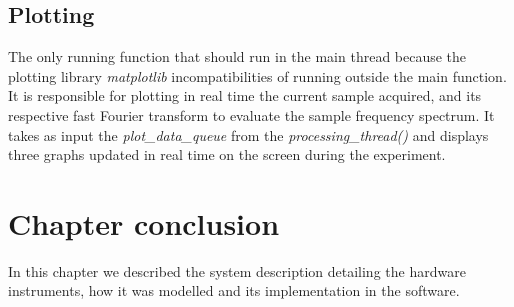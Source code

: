     \subsection{Plotting}

        The only running function that should run in the main thread because the plotting library \emph{matplotlib} incompatibilities of running outside the main function. 
        It is responsible for plotting in real time the current sample acquired, and its respective fast Fourier transform to evaluate the sample frequency spectrum.
        It takes as input the \emph{plot\_data\_queue} from the \emph{processing\_thread()} and displays three graphs updated in real time on the screen during the experiment.

  \section{Chapter conclusion}

    In this chapter we described the system description detailing the hardware instruments, how it was modelled and its implementation in the software. 


\clearpage